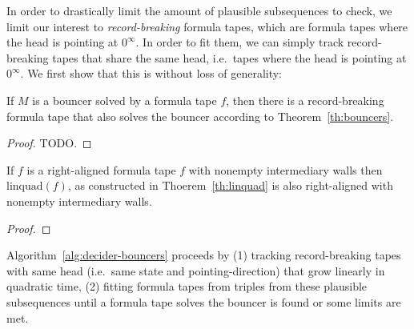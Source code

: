 In order to drastically limit the amount of plausible subsequences to check, we limit our interest to \textit{record-breaking} formula tapes, which are formula tapes where the head is pointing at $0^\infty$. In order to fit them, we can simply track record-breaking tapes that share the same head, i.e.\ tapes where the head is pointing at $0^\infty$. We first show that this is without loss of generality:

\begin{lemma}\label{lem:record-breaking}
    If $M$ is a bouncer solved by a formula tape $f$, then there is a record-breaking formula tape that also solves the bouncer according to Theorem~\ref{th:bouncers}.
\end{lemma}
\begin{proof}
    TODO.
\end{proof}

\begin{lemma}\label{lem:linquad-nonemptywalls}
    If $f$ is a right-aligned formula tape $f$ with nonempty intermediary walls then $\text{linquad}(f)$, as constructed in Thoerem~\ref{th:linquad} is also right-aligned with nonempty intermediary walls.
\end{lemma}
\begin{proof}

\end{proof}

Algorithm~\ref{alg:decider-bouncers} proceeds by (1) tracking record-breaking tapes with same head (i.e.\ same state and pointing-direction) that grow linearly in quadratic time, (2) fitting formula tapes from triples from these plausible subsequences until a formula tape solves the bouncer is found or some limits are met.




